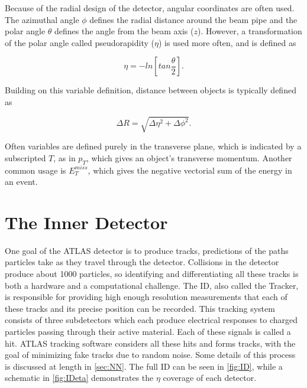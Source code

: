 Because of the radial design of the detector, angular coordinates are often used. The azimuthal angle $\phi$ defines the radial distance around the beam pipe and the polar angle $\theta$ defines the angle from the beam axis ($z$). However, a transformation of the polar angle called pseudorapidity ($\eta$) is used more often, and is defined as 

\begin{equation}
\eta = - ln [ tan \frac{\theta}{2} ]. 
\end{equation}

Building on this variable definition, distance between objects is typically defined as

\begin{equation}
\Delta R = \sqrt{\Delta\eta^2 + \Delta\phi^2}. 
\end{equation}

Often variables are defined purely in the transverse plane, which is indicated by a subscripted $T$, as in $p_T$, which gives an object's transverse momentum. Another common usage is $E_T^{miss}$, which gives the negative vectorial sum of the energy in an event. 


\section{The Inner Detector}
\label{sec:ID}

One goal of the ATLAS detector is to produce tracks, predictions of the paths particles take as they travel through the detector. Collisions in the detector produce about 1000 particles, so identifying and differentiating all these tracks is both a hardware and a computational challenge. The \ac{ID}, also called the Tracker, is responsible for providing high enough resolution measurements that each of these tracks and its precise position can be recorded. This tracking system consists of three subdetectors which each produce electrical responses to charged particles passing through their active material. Each of these signals is called a hit. ATLAS tracking software considers all these hits and forms tracks, with the goal of minimizing fake tracks due to random noise. Some details of this process is discussed at length in \autoref{sec:NN}. The full \ac{ID} can be seen in \autoref{fig:ID}, while a schematic in \autoref{fig:IDeta} demonstrates the $\eta$ coverage of each detector.

